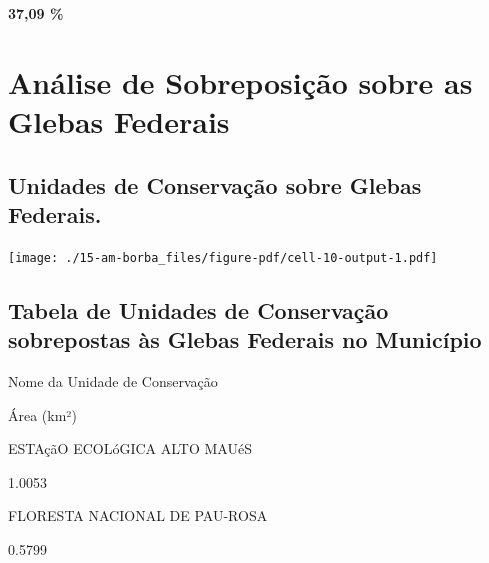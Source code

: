 \documentclass[
  letterpaper,
]{report}
\begin{document}
\textbf{37,09 \%}

\hypertarget{anuxe1lise-de-sobreposiuxe7uxe3o-sobre-as-glebas-federais-1}{%
\section{Análise de Sobreposição sobre as Glebas
Federais}\label{anuxe1lise-de-sobreposiuxe7uxe3o-sobre-as-glebas-federais-1}}

\hypertarget{unidades-de-conservauxe7uxe3o-sobre-glebas-federais.-1}{%
\subsection{Unidades de Conservação sobre Glebas
Federais.}\label{unidades-de-conservauxe7uxe3o-sobre-glebas-federais.-1}}

\texttt{[image: ./15-am-borba\_files/figure-pdf/cell-10-output-1.pdf]}

\hypertarget{tabela-de-unidades-de-conservauxe7uxe3o-sobrepostas-uxe0s-glebas-federais-no-municuxedpio-1}{%
\subsection{Tabela de Unidades de Conservação sobrepostas às Glebas
Federais no
Município}\label{tabela-de-unidades-de-conservauxe7uxe3o-sobrepostas-uxe0s-glebas-federais-no-municuxedpio-1}}

\n  

\n    

\n      

Nome da Unidade de Conservação

\n      

Área (km²)

\n    

\n  

\n  

\n    

\n      

ESTAçãO ECOLóGICA ALTO MAUéS

\n      

1.0053

\n    

\n    

\n      

FLORESTA NACIONAL DE PAU-ROSA

\n      

0.5799

\n    

\n    
\end{document}
